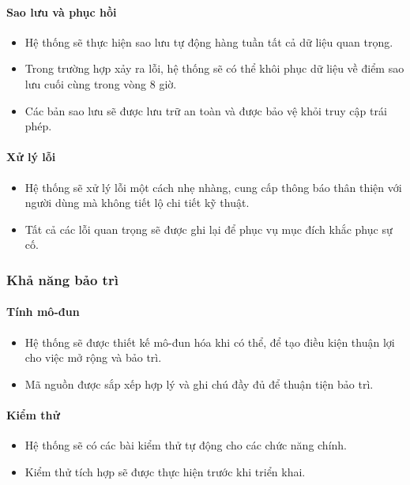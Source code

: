 \paragraph{Sao lưu và phục hồi}
\begin{itemize}
    \item Hệ thống sẽ thực hiện sao lưu tự động hàng tuần tất cả dữ liệu quan trọng.
    \item Trong trường hợp xảy ra lỗi, hệ thống sẽ có thể khôi phục dữ liệu về điểm sao lưu cuối cùng trong vòng 8 giờ.
    \item Các bản sao lưu sẽ được lưu trữ an toàn và được bảo vệ khỏi truy cập trái phép.
\end{itemize}

\paragraph{Xử lý lỗi}
\begin{itemize}
    \item Hệ thống sẽ xử lý lỗi một cách nhẹ nhàng, cung cấp thông báo thân thiện với người dùng mà không tiết lộ chi tiết kỹ thuật.
    \item Tất cả các lỗi quan trọng sẽ được ghi lại để phục vụ mục đích khắc phục sự cố.
\end{itemize}

\subsubsection{Khả năng bảo trì}

\paragraph{Tính mô-đun}
\begin{itemize}
    \item Hệ thống sẽ được thiết kế mô-đun hóa khi có thể, để tạo điều kiện thuận lợi cho việc mở rộng và bảo trì.
    \item Mã nguồn được sắp xếp hợp lý và ghi chú đầy đủ để thuận tiện bảo trì.
\end{itemize}

\paragraph{Kiểm thử}
\begin{itemize}
    \item Hệ thống sẽ có các bài kiểm thử tự động cho các chức năng chính.
    \item Kiểm thử tích hợp sẽ được thực hiện trước khi triển khai.
\end{itemize}


